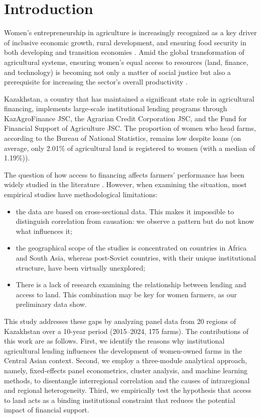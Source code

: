 ﻿\documentclass[pdflatex,sn-mathphys-ay]{sn-jnl}
\begin{document}
\section{Introduction}\label{sec:introduction}

Women's entrepreneurship in agriculture is increasingly recognized as a key driver of inclusive economic growth, rural development, and ensuring food security in both developing and transition economies \citep{ref78}. Amid the global transformation of agricultural systems, ensuring women's equal access to resources (land, finance, and technology) is becoming not only a matter of social justice but also a prerequisite for increasing the sector's overall productivity \citep{ref62,ref26}.

Kazakhstan, a country that has maintained a significant state role in agricultural financing, implements large-scale institutional lending programs through KazAgroFinance JSC, the Agrarian Credit Corporation JSC, and the Fund for Financial Support of Agriculture JSC. The proportion of women who head farms, according to the Bureau of National Statistics, remains low despite loans (on average, only 2.01\% of agricultural land is registered to women (with a median of 1.19\%)).

The question of how access to financing affects farmers' performance has been widely studied in the literature \citep{ref94,ref99}. However, when examining the situation, most empirical studies have methodological limitations:

\begin{itemize}
\item the data are based on cross-sectional data. This makes it impossible to distinguish correlation from causation: we observe a pattern but do not know what influences it;
\item the geographical scope of the studies is concentrated on countries in Africa and South Asia, whereas post-Soviet countries, with their unique institutional structure, have been virtually unexplored;
\item There is a lack of research examining the relationship between lending and access to land. This combination may be key for women farmers, as our preliminary data show.
\end{itemize}

This study addresses these gaps by analyzing panel data from 20 regions of Kazakhstan over a 10-year period (2015--2024, 175 farms). The contributions of this work are as follows. First, we identify the reasons why institutional agricultural lending influences the development of women-owned farms in the Central Asian context. Second, we employ a three-module analytical approach, namely, fixed-effects panel econometrics, cluster analysis, and machine learning methods, to disentangle interregional correlation and the causes of intraregional and regional heterogeneity. Third, we empirically test the hypothesis that access to land acts as a binding institutional constraint that reduces the potential impact of financial support.
\end{document}
